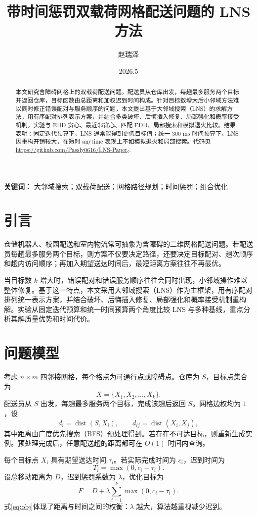 \documentclass[11pt,a4paper]{ctexart}
\title{带时间惩罚双载荷网格配送问题的 LNS 方法}
\author{赵瑞泽}
\date{2026.5}
\begin{document}
\maketitle

\begin{abstract}
\indent 本文研究含障碍网格上的双载荷配送问题。配送员从仓库出发，每趟最多服务两个目标并返回仓库，目标函数由总距离和加权迟到时间构成。针对目标数增大后小邻域方法难以同时修正错误配对与服务顺序的问题，本文提出基于大邻域搜索（LNS）的求解方法，用有序配对排列表示方案，并结合多类破坏、后悔插入修复、局部强化和概率接受机制。实验与 EDD 贪心、最近邻贪心、匹配 EDD、局部搜索和模拟退火比较。结果表明：固定迭代预算下，LNS 通常能得到更低目标值；统一 $300$ ms 时间预算下，LNS 因重构开销较大，在短时 anytime 表现上不如模拟退火和局部搜索。代码见 \url{https://github.com/Passly0616/LNS-Paper}。
\end{abstract}

\indent\textbf{关键词：} 大邻域搜索；双载荷配送；网格路径规划；时间惩罚；组合优化

\section{引言}

\indent 仓储机器人、校园配送和室内物流常可抽象为含障碍的二维网格配送问题。若配送员每趟最多服务两个目标，则方案不仅要决定路径，还要决定目标配对、趟次顺序和趟内访问顺序；再加入期望送达时间后，最短距离方案往往不再最优。

\indent 当目标数 $k$ 增大时，错误配对和错误服务顺序往往会同时出现，小邻域操作难以整体修复。基于这一特点，本文采用大邻域搜索（LNS）作为主框架，用有序配对排列统一表示方案，并结合破坏、后悔插入修复、局部强化和概率接受机制重构解。实验从固定迭代预算和统一时间预算两个角度比较 LNS 与多种基线，重点分析其解质量优势和时间代价。

\section{问题模型}

\indent 考虑 $n\times m$ 四邻接网格，每个格点为可通行点或障碍点。仓库为 $S$，目标点集合为
\[
X=\{X_1,X_2,\ldots,X_k\}.
\]
\indent 配送员从 $S$ 出发，每趟最多服务两个目标，完成该趟后返回 $S$。网格边权均为 $1$，设
\[
d_i=\operatorname{dist}(S,X_i),\qquad d_{ij}=\operatorname{dist}(X_i,X_j),
\]
\indent 其中距离由广度优先搜索（BFS）预处理得到。若存在不可达目标，则重新生成实例。预处理完成后，任意配送趟的距离都可在 $O(1)$ 时间内查询。

\indent 每个目标点 $X_i$ 具有期望送达时间 $\tau_i$。若实际完成时间为 $c_i$，迟到时间为
\[
T_i=\max(0,c_i-\tau_i).
\]
\indent 设总移动距离为 $D$，迟到惩罚系数为 $\lambda$，优化目标为
\begin{equation}
F=D+\lambda\sum_{i=1}^{k}\max(0,c_i-\tau_i).\label{eq:obj}
\end{equation}
\indent 式\eqref{eq:obj}体现了距离与时间之间的权衡：$\lambda$ 越大，算法越重视减少迟到。
\end{document}
